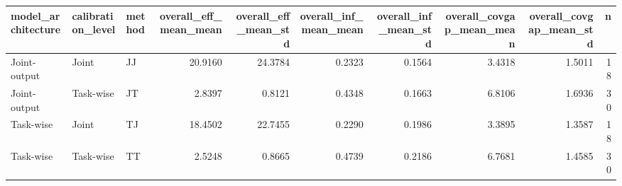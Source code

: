 \begin{tabular}{lllrrrrrrr}
\toprule
model_architecture & calibration_level & method & overall_eff_mean_mean & overall_eff_mean_std & overall_inf_mean_mean & overall_inf_mean_std & overall_covgap_mean_mean & overall_covgap_mean_std & n \\
\midrule
Joint-output & Joint & JJ & 20.9160 & 24.3784 & 0.2323 & 0.1564 & 3.4318 & 1.5011 & 18 \\
Joint-output & Task-wise & JT & 2.8397 & 0.8121 & 0.4348 & 0.1663 & 6.8106 & 1.6936 & 30 \\
Task-wise & Joint & TJ & 18.4502 & 22.7455 & 0.2290 & 0.1986 & 3.3895 & 1.3587 & 18 \\
Task-wise & Task-wise & TT & 2.5248 & 0.8665 & 0.4739 & 0.2186 & 6.7681 & 1.4585 & 30 \\
\bottomrule
\end{tabular}
